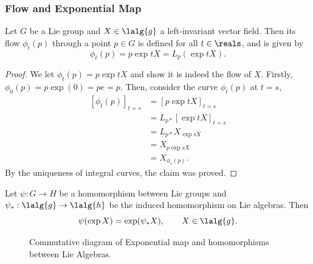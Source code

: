 \documentclass[../main.tex]{subfiles}
\begin{document}
\subsubsection{Flow and Exponential Map}
\begin{theorem}
\label{thm:The-Flow-and-the-Exponential-Map}
    Let \(G\) be a Lie group and \(X \in \lalg{g}\) a left-invariant
    vector field. Then its flow \(\phi_t(p)\) through a point \(p \in G\)
    is defined for all \(t \in \reals\), and is given by
    \[
    \phi_t(p) = p\exp tX = L_p\left( \exp tX \right).
    \]
\end{theorem}
\begin{proof}
    We let \(\phi_t(p) = p\exp tX\) and show it is indeed the flow of
    \(X\). Firstly, \(\phi_0(p) = p\exp(0) = pe = p\). 
    Then, consider the curve \(\phi_t(p)\) at \(t=s\), 
    \[
    \begin{aligned}
    [\phi_t(p)]_{t=s} &= [p\exp tX]_{t=s} \\
                      &= L_{p*}[\exp tX]_{t=s} \\
                      &= L_{p*} X_{\exp sX} \\
                      &= X_{p\exp sX} \\
                      &= X_{\phi_s(p)}.
    \end{aligned}
    \]
    By the uniqueness of integral curves, the claim was proved.
\end{proof}
\begin{theorem}
\label{thm:Exponential-Map-and-Induced-Homomorphisms}
    Let \(\psi : G \to H\) be a homomorphism between Lie groups and
    \(\psi_* : \lalg{g} \to \lalg{h}\) be the induced homomorphism on Lie
    algebras. Then
    \[
        \psi(\exp X) = \exp(\psi_*X), \qquad X \in \lalg{g}.
    \]
\end{theorem}
\begin{figure}[htpb]
    \centering
    \caption{Commutative diagram of Exponential map and homomorphisms
    between Lie Algebras.}
    \label{fig:Exponential-Map-and-Induced-Homomorphisms}
\end{figure}
\end{document}
